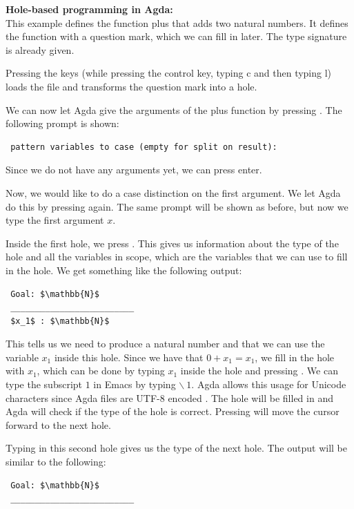 \begin{example}
  \label{ex:agda-hole-based-programming}
  \textbf{Hole-based programming in Agda:} \\
 This example defines the function \textsf{plus} that adds two natural numbers.
 It defines the function with a question mark, which we can fill in later. The type signature is already given.
  
  \unskip\noindent
 Pressing the keys  (while pressing the control key, typing c and then typing l) loads the file and transforms the question mark into a hole.
  
  \unskip\noindent
 We can now let Agda give the arguments of the plus function by pressing . The following prompt is shown:
  \begin{verbatim}
 pattern variables to case (empty for split on result):
  \end{verbatim}
 Since we do not have any arguments yet, we can press enter.
  
  \unskip\noindent
 Now, we would like to do a case distinction on the first argument. We let Agda do this by pressing  again.
 The same prompt will be shown as before, but now we type the first argument $x$.
  
  \unskip\noindent
 Inside the first hole, we press . This gives us information about the type of the hole and all the variables in scope,
 which are the variables that we can use to fill in the hole. We get something like the following output:
  \begin{lstlisting}
 Goal: $\mathbb{N}$
 _________________________
 $x_1$ : $\mathbb{N}$
  \end{lstlisting}
 This tells us we need to produce a natural number and that we can use the variable $x_1$ inside this hole.
 Since we have that $0 + x_1 = x_1$, we fill in the hole with $x_1$, which can be done by typing $x_1$ inside the hole and pressing .
 We can type the subscript $1$ in Emacs by typing \textsf{$\backslash \ 1$}. Agda allows this usage for Unicode characters since Agda files are UTF-8 encoded \cite{AgdaDocs}.
 The hole will be filled in and Agda will check if the type of the hole is correct. Pressing  will move the cursor forward to the next hole.
  
  \unskip\noindent
 Typing  in this second hole gives us the type of the next hole. The output will be similar to the following:
  \begin{lstlisting}
 Goal: $\mathbb{N}$
 _________________________

\end{lstlisting}
\end{example}
